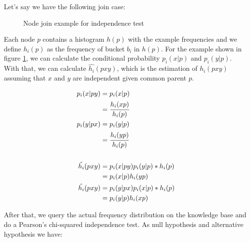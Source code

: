 Let's say we have the following join case:
 
\begin{figure}[!h]
  \caption{Node join example for independence test}
  \centering
  \label{fig:joinIndepExample}
\end{figure}

Each node $p$ contains a histogram $h(p)$ with the example frequencies and we define $h_i(p)$ as the frequency of bucket
$b_i$ in $h(p)$. For the example shown in figure \ref{fig:joinIndepExample}, we can calculate the conditional
probability $p_i(x|p)$ and $p_i(y|p)$. With that, we can calculate $\hat{h_i}(p x y)$, which is the estimation of
$h_i(p x y)$ assuming that $x$ and $y$ are independent given common parent $p$.

\begin{equation}
\label{eq:condindep}
\begin{split}
 p_i(x|py) &= p_i(x|p) \\ 
 &= \cfrac{h_i(xp)}{h_i(p)} \\ 
 p_i(y|px) &= p_i(y|p) \\ 
 &= \cfrac{h_i(yp)}{h_i(p)} \\ \\ 
 \hat{h_i}(pxy) &= p_i(x|py)p_i(y|p)*h_i(p) \\ 
 &= p_i(x|p)h_i(yp) \\ 
 \hat{h_i}(pxy) &= p_i(y|px)p_i(x|p)*h_i(p) \\ 
 &= p_i(y|p)h_i(xp)
\end{split}
\end{equation}

After that, we query the actual frequency distribution on the knowledge base and do a Pearson's chi-squared
independence test. As null hypothesis and alternative hypothesis we have:

